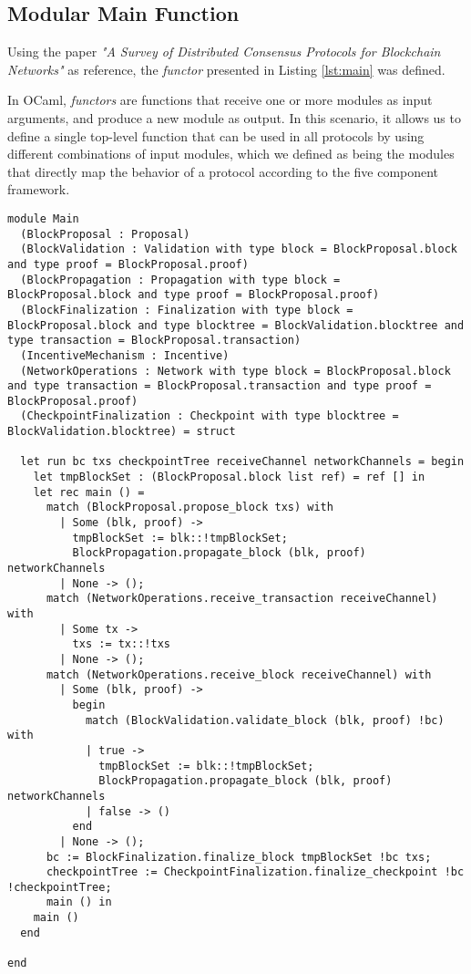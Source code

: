 \subsection{Modular Main Function}

Using the paper \textit{"A Survey of Distributed Consensus Protocols for Blockchain Networks"} \cite{survey_bchain_networks} as reference, the \textit{functor} presented in Listing \ref{lst:main} was defined.

In OCaml, \textit{functors} are functions that receive one or more modules as input arguments, and produce a new module as output. In this scenario, it allows us to define a single top-level function that can be used in all protocols by using different combinations of input modules, which we defined as being the modules that directly map the behavior of a protocol according to the five component framework.

\begin{lstlisting}
module Main
  (BlockProposal : Proposal)
  (BlockValidation : Validation with type block = BlockProposal.block and type proof = BlockProposal.proof)
  (BlockPropagation : Propagation with type block = BlockProposal.block and type proof = BlockProposal.proof)
  (BlockFinalization : Finalization with type block = BlockProposal.block and type blocktree = BlockValidation.blocktree and type transaction = BlockProposal.transaction)
  (IncentiveMechanism : Incentive)
  (NetworkOperations : Network with type block = BlockProposal.block and type transaction = BlockProposal.transaction and type proof = BlockProposal.proof)
  (CheckpointFinalization : Checkpoint with type blocktree = BlockValidation.blocktree) = struct

  let run bc txs checkpointTree receiveChannel networkChannels = begin
    let tmpBlockSet : (BlockProposal.block list ref) = ref [] in
    let rec main () =
      match (BlockProposal.propose_block txs) with
        | Some (blk, proof) ->
          tmpBlockSet := blk::!tmpBlockSet;
          BlockPropagation.propagate_block (blk, proof) networkChannels
        | None -> ();
      match (NetworkOperations.receive_transaction receiveChannel) with
        | Some tx ->
          txs := tx::!txs
        | None -> ();
      match (NetworkOperations.receive_block receiveChannel) with
        | Some (blk, proof) ->
          begin
            match (BlockValidation.validate_block (blk, proof) !bc) with
            | true ->
              tmpBlockSet := blk::!tmpBlockSet;
              BlockPropagation.propagate_block (blk, proof) networkChannels
            | false -> ()
          end
        | None -> ();
      bc := BlockFinalization.finalize_block tmpBlockSet !bc txs;
      checkpointTree := CheckpointFinalization.finalize_checkpoint !bc !checkpointTree;
      main () in
    main ()
  end

end
\end{lstlisting}

